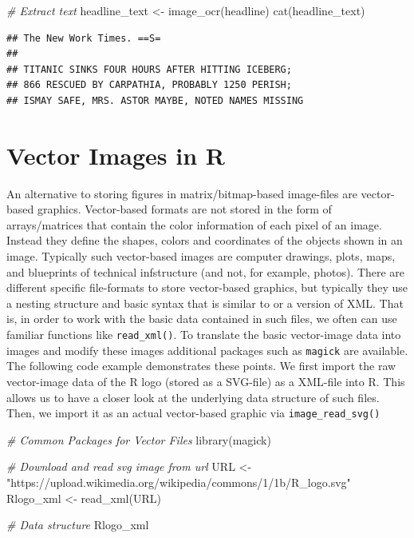\documentclass[
  12pt,
]{style/krantz}
\newenvironment{Shaded}{\begin{snugshade}}{\end{snugshade}}
\newcommand{\CommentTok}[1]{\textcolor[rgb]{0.56,0.35,0.01}{\textit{#1}}}
\newcommand{\FunctionTok}[1]{\textcolor[rgb]{0.00,0.00,0.00}{#1}}
\newcommand{\NormalTok}[1]{#1}
\newcommand{\OtherTok}[1]{\textcolor[rgb]{0.56,0.35,0.01}{#1}}
\newcommand{\StringTok}[1]{\textcolor[rgb]{0.31,0.60,0.02}{#1}}
\begin{document}
\begin{Shaded}
\begin{Highlighting}[]
\CommentTok{\# Extract text}
\NormalTok{headline\_text }\OtherTok{\textless{}{-}} \FunctionTok{image\_ocr}\NormalTok{(headline)}
\FunctionTok{cat}\NormalTok{(headline\_text)}
\end{Highlighting}
\end{Shaded}

\begin{verbatim}
## The New Work Times. ==S=
## 
## TITANIC SINKS FOUR HOURS AFTER HITTING ICEBERG;
## 866 RESCUED BY CARPATHIA, PROBABLY 1250 PERISH;
## ISMAY SAFE, MRS. ASTOR MAYBE, NOTED NAMES MISSING
\end{verbatim}

\hypertarget{vector-images-in-r}{%
\section{Vector Images in R}\label{vector-images-in-r}}

An alternative to storing figures in matrix/bitmap-based image-files are vector-based graphics. Vector-based formats are not stored in the form of arrays/matrices that contain the color information of each pixel of an image. Instead they define the shapes, colors and coordinates of the objects shown in an image. Typically such vector-based images are computer drawings, plots, maps, and blueprints of technical infstructure (and not, for example, photos). There are different specific file-formats to store vector-based graphics, but typically they use a nesting structure and basic syntax that is similar to or a version of XML. That is, in order to work with the basic data contained in such files, we often can use familiar functions like \texttt{read\_xml()}. To translate the basic vector-image data into images and modify these images additional packages such as \texttt{magick} are available. The following code example demonstrates these points. We first import the raw vector-image data of the R logo (stored as a SVG-file) as a XML-file into R. This allows us to have a closer look at the underlying data structure of such files. Then, we import it as an actual vector-based graphic via \texttt{image\_read\_svg()}

\begin{Shaded}
\begin{Highlighting}[]
\CommentTok{\# Common Packages for Vector Files}
\FunctionTok{library}\NormalTok{(magick)}

\CommentTok{\# Download and read svg image from url}
\NormalTok{URL }\OtherTok{\textless{}{-}} \StringTok{"https://upload.wikimedia.org/wikipedia/commons/1/1b/R\_logo.svg"}
\NormalTok{Rlogo\_xml }\OtherTok{\textless{}{-}} \FunctionTok{read\_xml}\NormalTok{(URL)}

\CommentTok{\# Data structure}
\NormalTok{Rlogo\_xml }
\end{Highlighting}
\end{Shaded}
\end{document}
